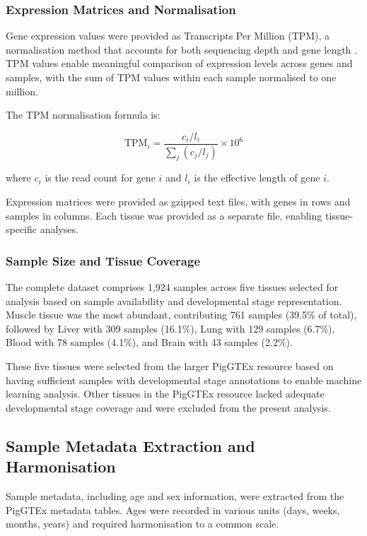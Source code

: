 \subsubsection{Expression Matrices and Normalisation}

Gene expression values were provided as Transcripts Per Million (TPM), a normalisation method that accounts for both sequencing depth and gene length \parencite{zhao_tpm_2021}. TPM values enable meaningful comparison of expression levels across genes and samples, with the sum of TPM values within each sample normalised to one million.

The TPM normalisation formula is:

\begin{equation}
    \text{TPM}_i = \frac{c_i / l_i}{\sum_j (c_j / l_j)} \times 10^6
    \label{eq:tpm}
\end{equation}

where $c_i$ is the read count for gene $i$ and $l_i$ is the effective length of gene $i$.

Expression matrices were provided as gzipped text files, with genes in rows and samples in columns. Each tissue was provided as a separate file, enabling tissue-specific analyses.

\subsubsection{Sample Size and Tissue Coverage}

The complete dataset comprises 1,924 samples across five tissues selected for analysis based on sample availability and developmental stage representation. Muscle tissue was the most abundant, contributing 761 samples (39.5\% of total), followed by Liver with 309 samples (16.1\%), Lung with 129 samples (6.7\%), Blood with 78 samples (4.1\%), and Brain with 43 samples (2.2\%).

These five tissues were selected from the larger PigGTEx resource based on having sufficient samples with developmental stage annotations to enable machine learning analysis. Other tissues in the PigGTEx resource lacked adequate developmental stage coverage and were excluded from the present analysis.

\subsection{Sample Metadata Extraction and Harmonisation}

Sample metadata, including age and sex information, were extracted from the PigGTEx metadata tables. Ages were recorded in various units (days, weeks, months, years) and required harmonisation to a common scale.

